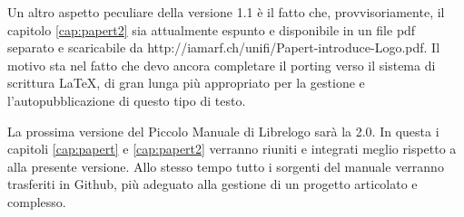Un altro aspetto peculiare della versione 1.1 è il fatto che, provvisoriamente, il capitolo \ref{cap:papert2} sia attualmente espunto e disponibile in un file pdf separato e scaricabile da http://iamarf.ch/unifi/Papert-introduce-Logo.pdf. Il motivo sta nel fatto che devo ancora completare il porting verso il sistema di scrittura \LaTeX, di gran lunga più appropriato per la gestione e l'autopubblicazione di questo tipo di testo.

La prossima versione del Piccolo Manuale di Librelogo sarà la 2.0. In questa i capitoli \ref{cap:papert} e \ref{cap:papert2} verranno riuniti e integrati meglio rispetto a alla presente versione. Allo stesso tempo tutto i sorgenti del manuale verranno trasferiti in Github, più adeguato alla gestione di un progetto articolato e complesso.


